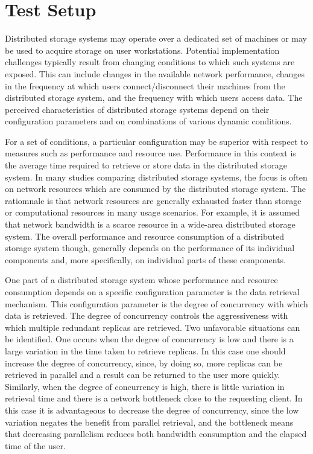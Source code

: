 \documentclass[11pt]{article}
\begin{document}
\section{Test Setup}
Distributed storage systems may operate over a dedicated set of machines 
or may be used to acquire storage on user workstations. Potential 
implementation challenges typically result from changing conditions to 
which such systems are exposed. This can include changes in the 
available network performance, changes in the frequency at which users 
connect/disconnect their machines from the distributed storage system, 
and the frequency with which users access data. The perceived 
characteristics of distributed storage systems depend on their 
configuration parameters and on combinations of various dynamic 
conditions.

For a set of conditions, a particular configuration may be superior with 
respect to measures such as performance and resource use. Performance in 
this context is the average time required to retrieve or store data in the 
distributed storage system. In many studies comparing distributed storage 
systems, the focus is often on network resources which are consumed by the 
distributed storage system. The ratiomnale is that network resources are 
generally exhausted faster than storage or computational resources in many 
usage scenarios. For example, it is assumed that network bandwidth is a 
scarce resource in a wide-area distributed storage system. The overall 
performance and resource consumption of a distributed storage system though, 
generally depends on the performance of its individual components and, more 
specifically, on individual parts of these components.

One part of a distributed storage system whose performance and resource 
consumption depends on a specific configuration parameter is the data 
retrieval mechanism. This configuration parameter is the degree of 
concurrency with which data is retrieved. The degree of concurrency 
controls the aggressiveness with which multiple redundant replicas 
are retrieved. Two unfavorable situations can be identified. One occurs 
when the degree of concurrency is low and there is a large variation in 
the time taken to retrieve replicas. In this case one should increase the 
degree of concurrency, since, by doing so, more replicas can be retrieved 
in parallel and a result can be returned to the user more quickly. 
Similarly, when the degree of concurrency is high, there is little 
variation in retrieval time and there is a network bottleneck close to 
the requesting client. In this case it is advantageous to decrease the 
degree of concurrency, since the low variation negates the benefit from 
parallel retrieval, and the bottleneck means that decreasing parallelism 
reduces both bandwidth consumption and the elapsed time of the user.
\end{document}
